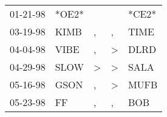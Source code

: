 \begin{supertabular}{lllll}
 01-21-98 &  *OE2* &               &               &  *CE2* \\
 03-19-98 &   KIMB &             , &             , &   TIME \\
 04-04-98 &   VIBE &             , &  \textgreater &   DLRD \\
 04-29-98 &   SLOW &  \textgreater &  \textgreater &   SALA \\
 05-16-98 &   GSON &             , &  \textgreater &   MUFB \\
 05-23-98 &     FF &             , &             , &    BOB \\
\end{supertabular}
